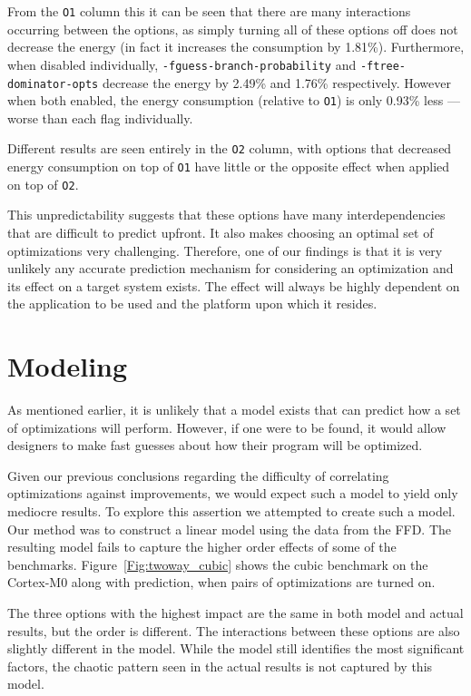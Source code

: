 \documentclass[twocolumn]{article}
\begin{document}
From the \texttt{O1} column this it can be seen that there are many interactions occurring between the options, as simply turning all of these options off does not decrease the energy (in fact it increases the consumption by 1.81\%). Furthermore, when disabled individually, \texttt{-fguess-branch-probability} and \texttt{-ftree-dominator-opts} decrease the energy by 2.49\% and 1.76\% respectively. However when both enabled, the energy consumption (relative to \texttt{O1}) is only 0.93\% less --- worse than each flag individually.

Different results are seen entirely in the \texttt{O2} column, with options that decreased energy consumption on top of \texttt{O1} have little or the opposite effect when applied on top of \texttt{O2}.

This unpredictability suggests that these options have many interdependencies that are difficult to predict upfront. It also makes choosing an optimal set of optimizations very challenging. Therefore, one of our findings is that it is very unlikely any accurate prediction mechanism for considering an optimization and its effect on a target system exists. The effect will always be highly dependent on the application to be used and the platform upon which it resides.

\section{Modeling}

As mentioned earlier, it is unlikely that a model exists that can predict how a set of optimizations will perform. However, if one were to be found, it would allow designers to make fast guesses about how their program will be optimized.

Given our previous conclusions regarding the difficulty of correlating optimizations against improvements, we would expect such a model to yield only mediocre results. To explore this assertion we attempted to create such a model. Our method was to construct a linear model using the data from the FFD. The resulting model fails to capture the higher order effects of some of the benchmarks. Figure~\ref{Fig:twoway_cubic} shows the cubic benchmark on the Cortex-M0 along with prediction, when pairs of optimizations are turned on.

The three options with the highest impact are the same in both model and actual results, but the order is different. The interactions between these options are also slightly different in the model. While the model still identifies the most significant factors, the chaotic pattern seen in the actual results is not captured by this model.
\end{document}
